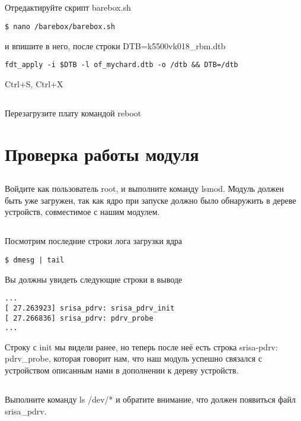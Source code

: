 \subsection{}Отредактируйте скрипт barebox.sh
\begin{lstlisting}[style=bash]
$ nano /barebox/barebox.sh
\end{lstlisting}
и впишите в него, после строки DTB=k5500vk018\_rbm.dtb
\begin{lstlisting}[style=stdout]
fdt_apply -i $DTB -l of_mychard.dtb -o /dtb && DTB=/dtb
\end{lstlisting}
Ctrl+S, Ctrl+X 

\subsection{}Перезагрузите плату командой reboot

\section{Проверка работы модуля}

\subsection{}Войдите как пользователь root, и выполните команду lsmod.
Модуль должен быть уже загружен, так как ядро при запуске должно было обнаружить в дереве устройств, совместимое с нашим модулем. 

\subsection{}Посмотрим последние строки лога загрузки ядра
\begin{lstlisting}[style=bash]
$ dmesg | tail
\end{lstlisting}
Вы должны увидеть следующие строки в выводе
\begin{lstlisting}[style=stdout]
...
[ 27.263923] srisa_pdrv: srisa_pdrv_init
[ 27.266836] srisa_pdrv: pdrv_probe
...
\end{lstlisting}

Строку с init мы видели ранее, но теперь после неё есть строка srisa-pdrv: pdrv\_probe, которая говорит нам, что наш модуль успешно связался с устройством описанным нами в дополнении к дереву устройств.

\subsection{}Выполните команду ls /dev/* и обратите внимание, что должен появиться файл srisa\_pdrv.

